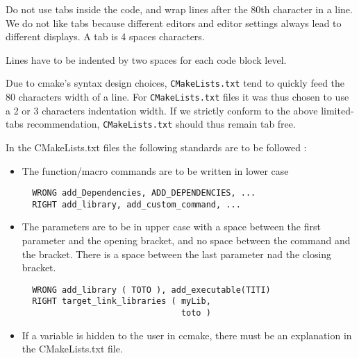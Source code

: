 \documentclass{article}
\begin{document}
Do not use tabs inside the code, and wrap lines after the 80th
character in a line. We do not like tabs because different editors and editor
settings always lead to different displays.
A tab is 4 spaces characters.

Lines have to be indented by two spaces for each code block level.

Due to cmake's syntax design choices, \texttt{CMakeLists.txt} tend to
quickly feed the 80 characters width of a line. For \texttt{CMakeLists.txt}
files it was thus chosen to use a 2 or 3 characters indentation width.
If we strictly conform to the above limited-tabs recommendation,
\texttt{CMakeLists.txt} should thus remain tab free.

In the CMakeLists.txt files the following standards are to be followed :
\begin{itemize}
\item The function/macro commands are to be written in lower case \\
\begin{verbatim}
  WRONG add_Dependencies, ADD_DEPENDENCIES, ...
  RIGHT add_library, add_custom_command, ...
\end{verbatim}
\item The parameters are to be in upper case with a space between the first 
  parameter and the opening bracket, and no space between the command and
  the bracket. There is a space between the last parameter nad the closing 
  bracket.
\begin{verbatim}
  WRONG add_library ( TOTO ), add_executable(TITI)
  RIGHT target_link_libraries ( myLib,
                                toto )
\end{verbatim}                                
\item If a variable is hidden to the user in ccmake, there must be an 
  explanation in the CMakeLists.txt file.
\end{itemize}
\end{document}

